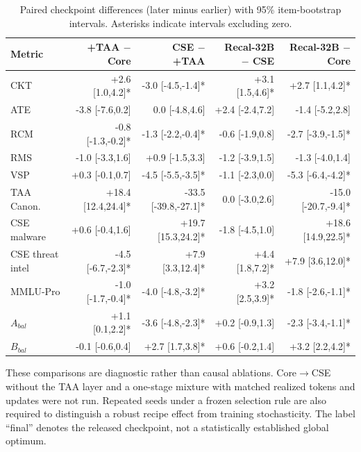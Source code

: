 \documentclass[conference]{IEEEtran}
\begin{document}
\begin{table}[t]
\caption{Paired checkpoint differences (later minus earlier) with 95\% item-bootstrap intervals. Asterisks indicate intervals excluding zero.}
\label{tab:transitions}
\centering
\scriptsize
\setlength{\tabcolsep}{2.5pt}
\begin{tabular}{@{}lrrrr@{}}
\toprule
Metric & +TAA $-$ Core & CSE $-$ +TAA & Recal-32B $-$ CSE & Recal-32B $-$ Core \\
\midrule
CKT & +2.6 [1.0,4.2]* & -3.0 [-4.5,-1.4]* & +3.1 [1.5,4.6]* & +2.7 [1.1,4.2]* \\
ATE & -3.8 [-7.6,0.2] & 0.0 [-4.8,4.6] & +2.4 [-2.4,7.2] & -1.4 [-5.2,2.8] \\
RCM & -0.8 [-1.3,-0.2]* & -1.3 [-2.2,-0.4]* & -0.6 [-1.9,0.8] & -2.7 [-3.9,-1.5]* \\
RMS & -1.0 [-3.3,1.6] & +0.9 [-1.5,3.3] & -1.2 [-3.9,1.5] & -1.3 [-4.0,1.4] \\
VSP & +0.3 [-0.1,0.7] & -4.5 [-5.5,-3.5]* & -1.1 [-2.3,0.0] & -5.3 [-6.4,-4.2]* \\
TAA Canon. & +18.4 [12.4,24.4]* & -33.5 [-39.8,-27.1]* & 0.0 [-3.0,2.6] & -15.0 [-20.7,-9.4]* \\
CSE malware & +0.6 [-0.4,1.6] & +19.7 [15.3,24.2]* & -1.8 [-4.5,1.0] & +18.6 [14.9,22.5]* \\
CSE threat intel & -4.5 [-6.7,-2.3]* & +7.9 [3.3,12.4]* & +4.4 [1.8,7.2]* & +7.9 [3.6,12.0]* \\
MMLU-Pro & -1.0 [-1.7,-0.4]* & -4.0 [-4.8,-3.2]* & +3.2 [2.5,3.9]* & -1.8 [-2.6,-1.1]* \\
$A_{bal}$ & +1.1 [0.1,2.2]* & -3.6 [-4.8,-2.3]* & +0.2 [-0.9,1.3] & -2.3 [-3.4,-1.1]* \\
$B_{bal}$ & -0.1 [-0.6,0.4] & +2.7 [1.7,3.8]* & +0.6 [-0.2,1.4] & +3.2 [2.2,4.2]* \\
\bottomrule
\end{tabular}
\end{table}

These comparisons are diagnostic rather than causal ablations. Core$\rightarrow$CSE without the TAA layer and a one-stage mixture with matched realized tokens and updates were not run. Repeated seeds under a frozen selection rule are also required to distinguish a robust recipe effect from training stochasticity. The label ``final'' denotes the released checkpoint, not a statistically established global optimum.
\end{document}

